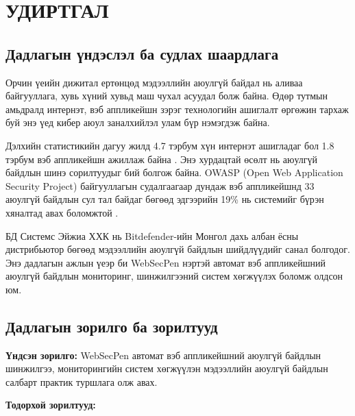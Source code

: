 \documentclass[main.tex]{subfiles}
\begin{document}
\chapter*{УДИРТГАЛ}

\section*{Дадлагын үндэслэл ба судлах шаардлага}

Орчин үеийн дижитал ертөнцөд мэдээллийн аюулгүй байдал нь аливаа байгууллага, хувь хүний хувьд маш чухал асуудал болж байна. Өдөр тутмын амьдралд интернэт, вэб аппликейшн зэрэг технологийн ашиглалт өргөжин тархаж буй энэ үед кибер аюул заналхийлэл улам бүр нэмэгдэж байна.

Дэлхийн статистикийн дагуу жилд 4.7 тэрбум хүн интернэт ашигладаг бол 1.8 тэрбум вэб аппликейшн ажиллаж байна \cite{2}. Энэ хурдацтай өсөлт нь аюулгүй байдлын шинэ сорилтуудыг бий болгож байна. OWASP (Open Web Application Security Project) байгууллагын судалгаагаар дундаж вэб аппликейшнд 33 аюулгүй байдлын сул тал байдаг бөгөөд эдгээрийн 19\% нь системийг бүрэн хяналтад авах боломжтой \cite{3}.

БД Системс Эйжиа ХХК нь Bitdefender-ийн Монгол дахь албан ёсны дистрибьютор бөгөөд мэдээллийн аюулгүй байдлын шийдлүүдийг санал болгодог. Энэ дадлагын ажлын үеэр би WebSecPen нэртэй автомат вэб аппликейшний аюулгүй байдлын мониторинг, шинжилгээний систем хөгжүүлэх боломж олдсон юм.

\section*{Дадлагын зорилго ба зорилтууд}

\textbf{Үндсэн зорилго:} WebSecPen автомат вэб аппликейшний аюулгүй байдлын шинжилгээ, мониторингийн систем хөгжүүлэн мэдээллийн аюулгүй байдлын салбарт практик туршлага олж авах.

\textbf{Тодорхой зорилтууд:}
\end{document}
